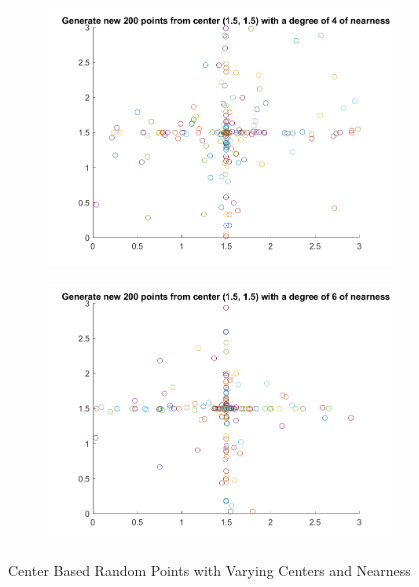 \begin{figure}
  \begin{subfigure}[b]{0.4\textwidth}
    \includegraphics[width=\textwidth]{img/cbr-6}
    \label{fig:cbr-6}
  \end{subfigure}
  \begin{subfigure}[b]{0.4\textwidth}
    \includegraphics[width=\textwidth]{img/cbr-7}
    \label{fig:cbr-7}
  \end{subfigure}

  \caption{Center Based Random Points with Varying Centers and Nearness}
\end{figure}
